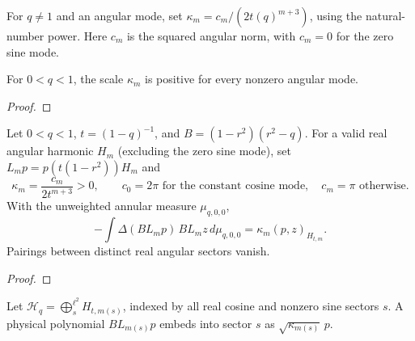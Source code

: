 \begin{supporting}
\begin{definition}
\label{def:annulus-energy-scale}
\leanok
For $q\ne1$ and an angular mode, set $\kappa_m=c_m/(2t(q)^{m+3})$, using the natural-number power. Here $c_m$ is the squared angular norm, with $c_m=0$ for the zero sine mode.
\end{definition}

\begin{theorem}
\label{thm:annulus-energy-scale}
\leanok
For $0<q<1$, the scale $\kappa_m$ is positive for every nonzero angular mode.
\end{theorem}
\begin{proof}
\leanok
\end{proof}

\begin{theorem}
\label{thm:annular-physical-energy}
\leanok
Let $0<q<1$, $t=(1-q)^{-1}$, and $B=(1-r^2)(r^2-q)$.
For a valid real angular harmonic $H_m$ (excluding the zero sine mode), set
$L_m p=p(t(1-r^2))H_m$ and
\[
 \kappa_m=\frac{c_m}{2t^{m+3}}>0,
 \qquad c_0=2\pi\text{ for the constant cosine mode},\quad c_m=\pi\text{ otherwise}.
\]
With the unweighted annular measure $\mu_{q,0,0}$,
\[
 -\int \Delta(BL_m p)\,BL_m z\,d\mu_{q,0,0}
   =\kappa_m(p,z)_{H_{t,m}}.
\]
Pairings between distinct real angular sectors vanish.
\end{theorem}
\begin{proof}
\leanok
\end{proof}

\begin{definition}
\label{def:annular-angular-energy}
\leanok
Let $\mathcal H_q=\bigoplus_{s}^{\ell^2}H_{t,m(s)}$, indexed by all real cosine
and nonzero sine sectors $s$. A physical polynomial $BL_{m(s)}p$ embeds into
sector $s$ as $\sqrt{\kappa_{m(s)}}\,p$.
\end{definition}


\end{supporting}
